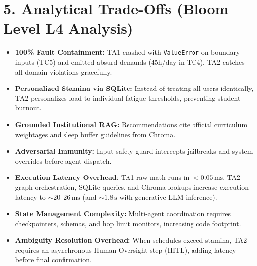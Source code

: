 \documentclass[10pt,a4paper]{article}
\begin{document}
\clearpage


\section*{\large \color{primary} 5. Analytical Trade-Offs (Bloom Level L4 Analysis)}
\vspace{-2pt}

\begin{minipage}[t]{0.485\textwidth}
\begin{tcolorbox}[basebox, colframe=successgreen, colback=succbg, title={\color{successgreen}\textbf{\textbullet\ What Got Better in TA2}}]
\small
\begin{itemize}[leftmargin=10pt]
  \item \textbf{100\% Fault Containment:} TA1 crashed with \texttt{ValueError} on boundary inputs (TC5) and emitted absurd demands (45h/day in TC4). TA2 catches all domain violations gracefully.
  \item \textbf{Personalized Stamina via SQLite:} Instead of treating all users identically, TA2 personalizes load to individual fatigue thresholds, preventing student burnout.
  \item \textbf{Grounded Institutional RAG:} Recommendations cite official curriculum weightages and sleep buffer guidelines from Chroma.
  \item \textbf{Adversarial Immunity:} Input safety guard intercepts jailbreaks and system overrides before agent dispatch.
\end{itemize}
\end{tcolorbox}
\end{minipage}
\hfill
\begin{minipage}[t]{0.485\textwidth}
\begin{tcolorbox}[basebox, colframe=accent, colback=tagamber!30, title={\color{accent}\textbf{\textbullet\ What Got Worse / Trade-offs in TA2}}]
\small
\begin{itemize}[leftmargin=10pt]
  \item \textbf{Execution Latency Overhead:} TA1 raw math runs in $<0.05\,\text{ms}$. TA2 graph orchestration, SQLite queries, and Chroma lookups increase execution latency to $\sim 20\text{--}26\,\text{ms}$ (and $\sim 1.8\,\text{s}$ with generative LLM inference).
  \item \textbf{State Management Complexity:} Multi-agent coordination requires checkpointers, schemas, and hop limit monitors, increasing code footprint.
  \item \textbf{Ambiguity Resolution Overhead:} When schedules exceed stamina, TA2 requires an asynchronous Human Oversight step (HITL), adding latency before final confirmation.
\end{itemize}
\end{tcolorbox}
\end{minipage}
\end{document}
